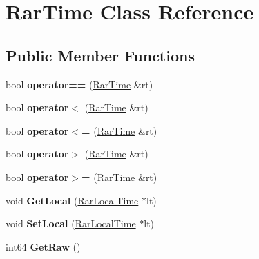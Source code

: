 \hypertarget{class_rar_time}{\section{Rar\-Time Class Reference}
\label{class_rar_time}
}
\subsection*{Public Member Functions}
\begin{DoxyCompactItemize}
\item 
\hypertarget{class_rar_time_a660243101164121b76f080b230ecf0d0}{bool {\bfseries operator==} (\hyperlink{class_rar_time}{Rar\-Time} \&rt)}\label{class_rar_time_a660243101164121b76f080b230ecf0d0}

\item 
\hypertarget{class_rar_time_aa3899980120b9d0bf62c821055a23bd7}{bool {\bfseries operator$<$} (\hyperlink{class_rar_time}{Rar\-Time} \&rt)}\label{class_rar_time_aa3899980120b9d0bf62c821055a23bd7}

\item 
\hypertarget{class_rar_time_a3b9c924a1ab108050bcbc0cb1ee2c22f}{bool {\bfseries operator$<$=} (\hyperlink{class_rar_time}{Rar\-Time} \&rt)}\label{class_rar_time_a3b9c924a1ab108050bcbc0cb1ee2c22f}

\item 
\hypertarget{class_rar_time_ad0ce18c2c9bfade4bdfa8a1861e3195d}{bool {\bfseries operator$>$} (\hyperlink{class_rar_time}{Rar\-Time} \&rt)}\label{class_rar_time_ad0ce18c2c9bfade4bdfa8a1861e3195d}

\item 
\hypertarget{class_rar_time_af844636bf6bf5fc32e9907777fdf4037}{bool {\bfseries operator$>$=} (\hyperlink{class_rar_time}{Rar\-Time} \&rt)}\label{class_rar_time_af844636bf6bf5fc32e9907777fdf4037}

\item 
\hypertarget{class_rar_time_a1c9eea16d7ead475734909e4ac75d5c1}{void {\bfseries Get\-Local} (\hyperlink{struct_rar_local_time}{Rar\-Local\-Time} $\ast$lt)}\label{class_rar_time_a1c9eea16d7ead475734909e4ac75d5c1}

\item 
\hypertarget{class_rar_time_af4bd79179dc9f29beccbc22e9e4f036c}{void {\bfseries Set\-Local} (\hyperlink{struct_rar_local_time}{Rar\-Local\-Time} $\ast$lt)}\label{class_rar_time_af4bd79179dc9f29beccbc22e9e4f036c}

\item 
\hypertarget{class_rar_time_a12782cfa1d6c200d9ca69f7f7ee643d3}{int64 {\bfseries Get\-Raw} ()}\label{class_rar_time_a12782cfa1d6c200d9ca69f7f7ee643d3}


\end{DoxyCompactItemize}
